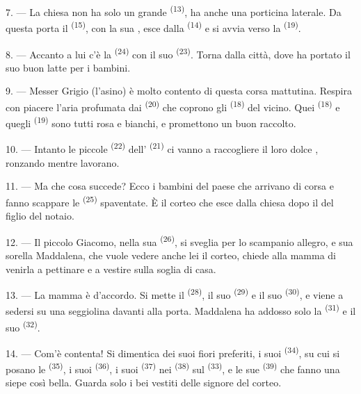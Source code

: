 7. --- La chiesa non ha solo un grande  \textsuperscript{(13)}, ha
anche una porticina laterale. Da questa porta il 
\textsuperscript{(15)}, con la sua , esce dalla 
\textsuperscript{(14)} e si avvia verso la  \textsuperscript{(19)}.

8. --- Accanto a lui c'è la  \textsuperscript{(24)} con il suo
 \textsuperscript{(23)}. Torna dalla città, dove ha portato il suo buon
latte per i bambini.

\VUsaut{4.0mm}
\VUsaut{3.4mm}

9. --- Messer Grigio (l'asino) è molto contento di questa corsa mattutina. Respira con
piacere l'aria profumata dai  \textsuperscript{(20)} che coprono gli
 \textsuperscript{(18)} del  vicino. Quei
 \textsuperscript{(18)} e quegli 
\textsuperscript{(19)} sono tutti rosa e bianchi, e promettono un buon raccolto.

10. --- Intanto le piccole  \textsuperscript{(22)} dell'
\textsuperscript{(21)} ci vanno a raccogliere il loro dolce ,
ronzando mentre lavorano.

11. --- Ma che cosa succede? Ecco i bambini del paese che arrivano di corsa e fanno
scappare le  \textsuperscript{(25)} spaventate. È il corteo che esce dalla
chiesa dopo il  del figlio del notaio.

12. --- Il piccolo Giacomo, nella sua  \textsuperscript{(26)}, si sveglia
per lo scampanio allegro, e sua sorella Maddalena, che vuole vedere anche lei il
corteo, chiede alla mamma di venirla a pettinare e a vestire sulla soglia di casa.

13. --- La mamma è d'accordo. Si mette il  \textsuperscript{(28)},
il suo  \textsuperscript{(29)} e il suo 
\textsuperscript{(30)}, e viene a sedersi su una seggiolina davanti alla porta.
Maddalena ha addosso solo la  \textsuperscript{(31)} e il suo
 \textsuperscript{(32)}.

14. --- Com'è contenta! Si dimentica dei suoi fiori preferiti, i suoi
 \textsuperscript{(34)}, su cui si posano le 
\textsuperscript{(35)}, i suoi  \textsuperscript{(36)}, i suoi
 \textsuperscript{(37)} nei  \textsuperscript{(38)} sul
 \textsuperscript{(33)}, e le sue 
\textsuperscript{(39)} che fanno una siepe così bella. Guarda solo i bei vestiti delle
signore del corteo.

